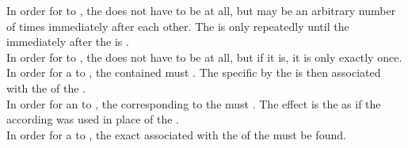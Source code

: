 {In order for  to , the  does not have to be  at all, but may be  an arbitrary number of times immediately after each other. The  is only repeatedly  until the  immediately after the  is . \\

In order for  to , the  does not have to be  at all, but if it is, it is only  exactly once. \\

In order for a  to , the  contained must . The specific   by the  is then associated with the  of the . \\

In order for an  to , the  corresponding to the  must . The effect is the as if the according  was used in place of the .\\

In order for a  to , the exact  associated with the  of the  must be found.
}

